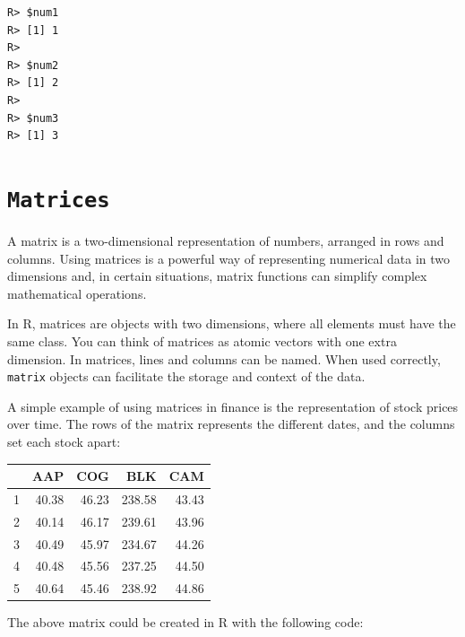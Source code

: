 \documentclass[
  12pt,
]{book}
\begin{document}
\begin{verbatim}
R> $num1
R> [1] 1
R> 
R> $num2
R> [1] 2
R> 
R> $num3
R> [1] 3
\end{verbatim}

\hypertarget{matrices}{%
\section{\texorpdfstring{\texttt{Matrices}}{Matrices}}\label{matrices}}

A matrix is a two-dimensional representation of numbers, arranged in rows and columns. Using matrices is a powerful way of representing numerical data in two dimensions and, in certain situations, matrix functions can simplify complex mathematical operations.  

In R, matrices are objects with two dimensions, where all elements must have the same class. You can think of matrices as atomic vectors with one extra dimension. In matrices, lines and columns can be named. When used correctly, \texttt{matrix} objects can facilitate the storage and context of the data. 

A simple example of using matrices in finance is the representation of stock prices over time. The rows of the matrix represents the different dates, and the columns set each stock apart:

\begin{longtable}[]{@{}lrrrr@{}}
\toprule
& AAP & COG & BLK & CAM\tabularnewline
\midrule
\endhead
1 & 40.38 & 46.23 & 238.58 & 43.43\tabularnewline
2 & 40.14 & 46.17 & 239.61 & 43.96\tabularnewline
3 & 40.49 & 45.97 & 234.67 & 44.26\tabularnewline
4 & 40.48 & 45.56 & 237.25 & 44.50\tabularnewline
5 & 40.64 & 45.46 & 238.92 & 44.86\tabularnewline
\bottomrule
\end{longtable}

The above matrix could be created in R with the following code:
\end{document}
